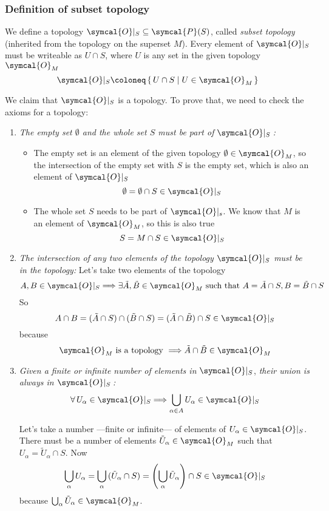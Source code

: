  \subsubsection{Definition of subset topology}
 We define a topology $\symcal{O}|_S \subseteq \symcal{P} (S)$, called
 \emph{subset topology} (inherited from the topology on the superset $M$).
 Every element of $\symcal{O}|_S$ must be writeable as $U\cap S$, where $U$ is
 any set in the given topology $\symcal{O}_M$
 \[
   \symcal{O}|_S \coloneq \set{U\cap S | U\in\symcal{O}_M}
 \]
 
 We claim that $\symcal{O}|_S$ is a topology. To prove that, we need to check
 the axioms for a topology:
 \begin{enumerate}
 \item \emph{The empty set $\emptyset$ and the whole set $S$ must be part of
     $\symcal{O}|_S$\,:}
   \begin{itemize}
   \item The empty set is an element of the given topology
     $\emptyset\in\symcal{O}_M$, so the intersection of the empty set with $S$
     is the empty set, which is also an element of $\symcal{O}|_S$
   \[
     \emptyset = \emptyset\cap S \in \symcal{O}|_S
   \]

 \item The whole set $S$ needs to be part of $\symcal{O}|_s$. We know that $M$
   is an element of $\symcal{O}_M$, so this is also true
   \[
     S = M\cap S \in \symcal{O}|_S
   \]
   \end{itemize}

 \item \emph {The intersection of any two elements of the topology}
   $\symcal{O}|_S$ \emph{must be in the topology:}
   Let's take two elements of the topology
   \[
     A, B\in\symcal{O}|_S
     \Longrightarrow
     \exists \tilde{A}, \tilde{B}\in\symcal{O}_M
     \text{ such that }
     A = \tilde{A}\cap S, B = \tilde{B}\cap S
   \]
   So
   \[
     A\cap B = (\tilde{A}\cap S) \cap (\tilde{B}\cap S)
     = (\tilde{A}\cap\tilde{B})\cap S \in\symcal{O}|_S
   \]
   because
   \[
     \symcal{O}_M \text{ is a topology }
     \Longrightarrow
     \tilde{A}\cap\tilde{B}\in \symcal{O}_M
   \]

 \item \emph{Given a finite or infinite number of elements in} $\symcal{O}|_S$,
   \emph{their union is always in $\symcal{O}|_S$\,:}
   \begin{equation}
     \forall\, U_\alpha \in \symcal{O}|_S
     \Longrightarrow
     \bigcup_{\alpha\in A} U_\alpha \in \symcal{O}|_S
   \end{equation}

   Let's take a number ---finite or infinite--- of elements of
   $U_\alpha\in\symcal{O}|_S$.
   There must be a number of elements $\tilde{U}_\alpha\in\symcal{O}_M$ such
   that $U_\alpha = \tilde{U}_\alpha \cap S$.
   Now
   \[
     \bigcup_\alpha U_\alpha
     = \bigcup_\alpha \,(\tilde{U}_\alpha\cap S)
     = \left(\bigcup_\alpha \tilde{U}_\alpha\right) \cap S\in\symcal{O}|_S
   \]
   because $\bigcup_\alpha \tilde{U}_\alpha\in\symcal{O}_M$.
 \end{enumerate}


